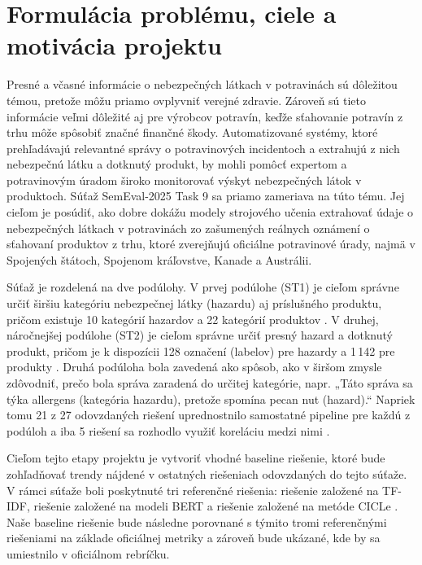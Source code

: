 \section{Formulácia problému, ciele a motivácia projektu}

Presné a včasné informácie o nebezpečných látkach v potravinách sú dôležitou témou, pretože môžu priamo ovplyvniť verejné zdravie. Zároveň sú tieto informácie veľmi dôležité aj pre výrobcov potravín, keďže sťahovanie potravín z trhu môže spôsobiť značné finančné škody. Automatizované systémy, ktoré prehľadávajú relevantné správy o potravinových incidentoch a extrahujú z nich nebezpečnú látku a dotknutý produkt, by mohli pomôcť expertom a potravinovým úradom široko monitorovať výskyt nebezpečných látok v produktoch. Súťaž SemEval-2025 Task 9 \cite{randl-etal-2025-semeval} sa priamo zameriava na túto tému. Jej cieľom je posúdiť, ako dobre dokážu modely strojového učenia extrahovať údaje o nebezpečných látkach v potravinách zo zašumených reálnych oznámení o sťahovaní produktov z trhu, ktoré zverejňujú oficiálne potravinové úrady, najmä v Spojených štátoch, Spojenom kráľovstve, Kanade a Austrálii.

Súťaž je rozdelená na dve podúlohy. V prvej podúlohe (ST1) je cieľom správne určiť širšiu kategóriu nebezpečnej látky (hazardu) aj príslušného produktu, pričom existuje 10 kategórií hazardov a 22 kategórií produktov \cite{wan-etal-2025-pateam}. V druhej, náročnejšej podúlohe (ST2) je cieľom správne určiť presný hazard a dotknutý produkt, pričom je k dispozícii 128 označení (labelov) pre hazardy a 1\,142 pre produkty \cite{wan-etal-2025-pateam}. Druhá podúloha bola zavedená ako spôsob, ako v širšom zmysle zdôvodniť, prečo bola správa zaradená do určitej kategórie, napr. „Táto správa sa týka allergens (kategória hazardu), pretože spomína pecan nut (hazard).“ Napriek tomu 21 z 27 odovzdaných riešení uprednostnilo samostatné pipeline pre každú z podúloh a iba 5 riešení sa rozhodlo využiť koreláciu medzi nimi \cite{randl-etal-2025-semeval}.


Cieľom tejto etapy projektu je vytvoriť vhodné baseline riešenie, ktoré bude zohľadňovať trendy nájdené v ostatných riešeniach odovzdaných do tejto súťaže. V rámci súťaže boli poskytnuté tri referenčné riešenia: riešenie založené na TF-IDF, riešenie založené na modeli BERT a riešenie založené na metóde CICLe \cite{randl-etal-2024-cicle, randl-etal-2025-semeval}. Naše baseline riešenie bude následne porovnané s týmito tromi referenčnými riešeniami na základe oficiálnej metriky a zároveň bude ukázané, kde by sa umiestnilo v oficiálnom rebríčku.      